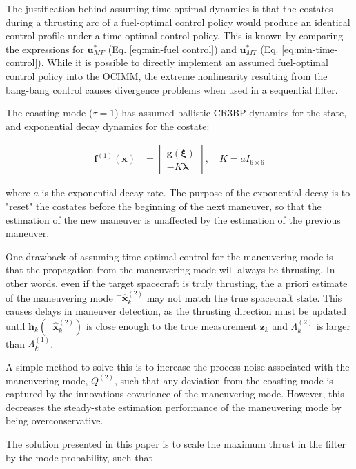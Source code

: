 \documentclass[letterpaper, preprint, paper,11pt]{AAS}	%
\begin{document}
The justification behind assuming time-optimal dynamics is that the costates during a thrusting arc of a fuel-optimal control policy would produce an identical control profile under a time-optimal control policy. This is known by comparing the expressions for $\bm{u}^*_{MF}$ (Eq. \ref{eq:min-fuel control}) and $\bm{u}^*_{MT}$ (Eq. \ref{eq:min-time-control}). While it is possible to directly implement an assumed fuel-optimal control policy into the OCIMM, the extreme nonlinearity resulting from the bang-bang control causes divergence problems when used in a sequential filter. 

The coasting mode ($\tau=1$) has assumed ballistic CR3BP dynamics for the state, and exponential decay dynamics for the costate:

\begin{align}
    \bm{f}^{(1)}(\bm{x}) &= \begin{bmatrix}
        \bm{g}(\bm{\xi}) \\
        -K \bm{\lambda}
    \end{bmatrix}, \quad K = aI_{6 \times 6}
\end{align}

\noindent where $a$ is the exponential decay rate. The purpose of the exponential decay is to "reset" the costates before the beginning of the next maneuver, so that the estimation of the new maneuver is unaffected by the estimation of the previous maneuver.

One drawback of assuming time-optimal control for the maneuvering mode is that the propagation from the maneuvering mode will always be thrusting. In other words, even if the target spacecraft is truly thrusting, the a priori estimate of the maneuvering mode $^-\hat{\bm{x}}_k^{(2)}$ may not match the true spacecraft state. This causes delays in maneuver detection, as the thrusting direction must be updated until $\bm{h}_k(^-\hat{\bm{x}}_k^{(2)})$ is close enough to the true measurement $\bm{z}_k$ and $\Lambda_k^{(2)}$ is larger than $\Lambda_k^{(1)}$. 

A simple method to solve this is to increase the process noise associated with the maneuvering mode, $Q^{(2)}$, such that any deviation from the coasting mode is captured by the innovations covariance of the maneuvering mode. However, this decreases the steady-state estimation performance of the maneuvering mode by being overconservative. 

The solution presented in this paper is to scale the maximum thrust in the filter by the mode probability, such that
\end{document}
